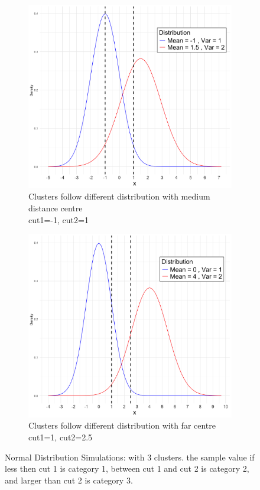 \documentclass{article}
\begin{document}
\begin{figure}[htbp!]
\begin{subfigure}{0.32\textwidth}
    \includegraphics[width=\textwidth]{images/dist_simu/norm_dist_medium.png} %
    \caption{Clusters follow different distribution with medium distance centre\\ cut1=-1, cut2=1}
\end{subfigure}
  \hfill
  \begin{subfigure}{0.32\textwidth}  %
      \centering
      \includegraphics[width=\textwidth]{images/dist_simu/norm_dist_far.png} %
      \caption{Clusters follow different distribution with far centre\\ cut1=1, cut2=2.5}
  \end{subfigure}
  
  \caption{Normal Distribution Simulations: with 3 clusters. the sample value if less then cut 1 is category 1, between cut 1 and cut 2 is category 2, and larger than cut 2 is category 3.}
  \label{fig:dist_sim}
\end{figure}
\end{document}
